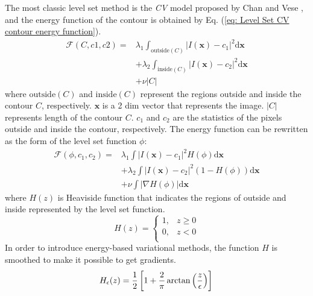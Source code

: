 The most classic level set method is the \emph{CV} model proposed by Chan and Vese \cite{LevelSet:chan2001active}, and the energy function of the contour is obtained by Eq. (\ref{eq: Level Set CV contour energy function}).
\begin{equation}\label{eq: Level Set CV contour energy function}
\begin{split}
    \mathcal{F}(C,c1,c2) = & \lambda_1\int_{\text{outside}(C)}\left|I(\mathbf{x})-c_1\right|^2 \mathrm{d}\mathbf{x} \\
     & + \lambda_2\int_{\text{inside}(C)}\left| I(\mathbf{x}) - c_2 \right|^2 \mathrm{d}\mathbf{x} \\
     & + \nu\left| C \right|
\end{split}
\end{equation}
where $\text{outside}(C)$ and $\text{inside}(C)$ represent the regions outside and inside the contour $C$, respectively. $\mathbf{x}$ is a 2 dim vector that represents the image. $|C|$ represents length of the contour $C$. $c_1$ and $c_2$ are the statistics of the pixels outside and inside the contour, respectively. The energy function can be rewritten as the form of the level set function $\phi$:
\begin{equation}\label{eq: Level Set CV phi energy function}
    \begin{split}
        \mathcal{F}(\phi, c_1, c_2) =
        & \lambda_1 \int \left| I(\mathbf{x}) - c_1 \right|^2 H(\phi) \mathrm{d}\mathbf{x} \\
        & + \lambda_2 \int \left| I(\mathbf{x}) - c_2 \right|^2 (1-H(\phi)) \mathrm{d}\mathbf{x} \\
        & + \nu \int \left| \nabla H(\phi) \right| \mathrm{d}\mathbf{x}
    \end{split}
\end{equation}
where $H(z)$ is Heaviside function that indicates the regions of outside and inside represented by the level set function.
\begin{equation}
    H(z) = \left\{
            \begin{matrix}
             1, & z\geq 0 \\
             0, & z < 0 \\
            \end{matrix}\right.
\end{equation}
In order to introduce energy-based variational methods, the function $H$ is smoothed to make it possible to get gradients.
\begin{equation}\label{eq: equation epsilon}
  H_\epsilon(z) = \frac{1}{2}\left[ 1+\frac{2}{\pi}\arctan\left(\frac{z}{\epsilon}\right) \right] \\
\end{equation}
